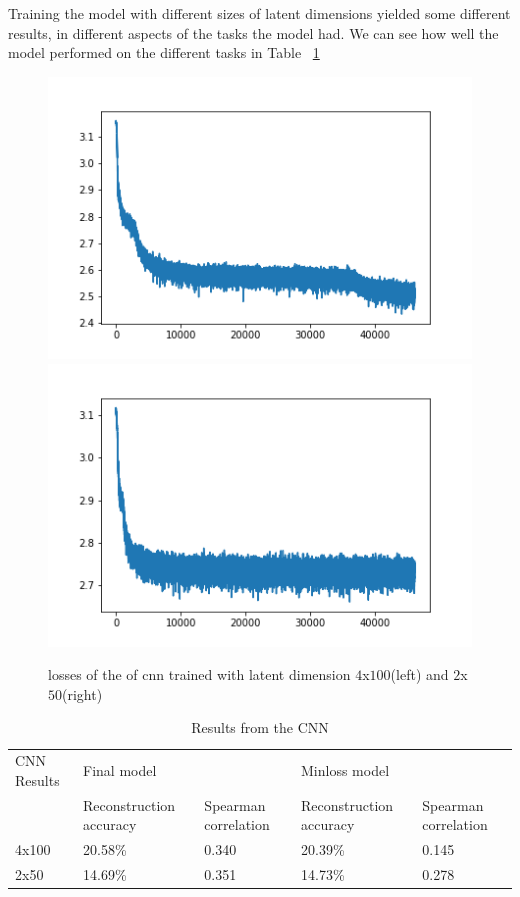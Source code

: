 Training the model with different sizes of latent dimensions yielded some different results, in different aspects of the tasks the model had. We can see how well the model performed on the different tasks in Table ~\ref{tab:cnn_results}\\

\begin{figure}[!ht]
  \centering
  \includegraphics[width=0.4\linewidth]{latex/imgs/CNN_loss_latent_dimension_100.png}
  \includegraphics[width=0.4\linewidth]{latex/imgs/loss_latent_dimension_50.png}
  \caption{losses of the of cnn trained with latent dimension $4$x$100$(left) and $2$x$50$(right)}
  \label{fig:cnn_loss}
\end{figure}

\begin{table}[]
\begin{tabular}{|l|ll|ll|}
\hline
CNN Results & Final model                                  &                      & Minloss model                                &                      \\ \cline{2-5}
            & \multicolumn{1}{l|}{Reconstruction accuracy} & Spearman correlation & \multicolumn{1}{l|}{Reconstruction accuracy} & Spearman correlation \\ \hline
4x100       & \multicolumn{1}{l|}{20.58\%}                 & 0.340                & \multicolumn{1}{l|}{20.39\%}                 & 0.145                \\ \hline
2x50        & \multicolumn{1}{l|}{14.69\%}                 & 0.351                & \multicolumn{1}{l|}{14.73\%}                 & 0.278                \\ \hline
\end{tabular}
\caption{Results from the CNN}
\label{tab:cnn_results}
\end{table}


